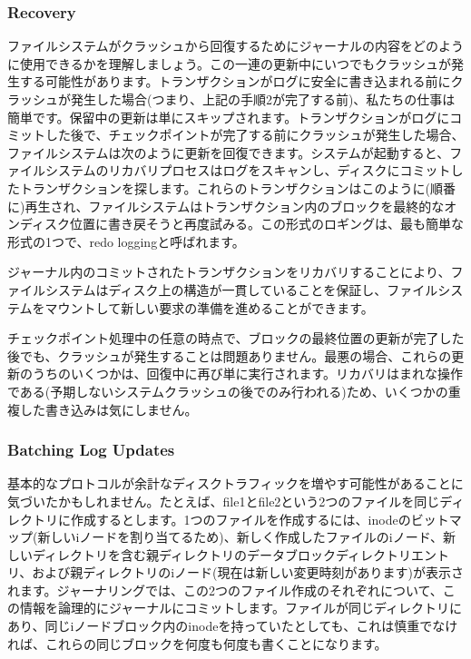 \hypertarget{recovery}{%
\subsubsection*{Recovery}\label{recovery}}

ファイルシステムがクラッシュから回復するためにジャーナルの内容をどのように使用できるかを理解しましょう。この一連の更新中にいつでもクラッシュが発生する可能性があります。トランザクションがログに安全に書き込まれる前にクラッシュが発生した場合(つまり、上記の手順2が完了する前)、私たちの仕事は簡単です。保留中の更新は単にスキップされます。トランザクションがログにコミットした後で、チェックポイントが完了する前にクラッシュが発生した場合、ファイルシステムは次のように更新を回復できます。システムが起動すると、ファイルシステムのリカバリプロセスはログをスキャンし、ディスクにコミットしたトランザクションを探します。これらのトランザクションはこのように(順番に)再生され、ファイルシステムはトランザクション内のブロックを最終的なオンディスク位置に書き戻そうと再度試みる。この形式のロギングは、最も簡単な形式の1つで、redo
loggingと呼ばれます。

ジャーナル内のコミットされたトランザクションをリカバリすることにより、ファイルシステムはディスク上の構造が一貫していることを保証し、ファイルシステムをマウントして新しい要求の準備を進めることができます。

チェックポイント処理中の任意の時点で、ブロックの最終位置の更新が完了した後でも、クラッシュが発生することは問題ありません。最悪の場合、これらの更新のうちのいくつかは、回復中に再び単に実行されます。リカバリはまれな操作である(予期しないシステムクラッシュの後でのみ行われる)ため、いくつかの重複した書き込みは気にしません。

\hypertarget{batching-log-updates}{%
\subsubsection*{Batching Log Updates}\label{batching-log-updates}}

基本的なプロトコルが余計なディスクトラフィックを増やす可能性があることに気づいたかもしれません。たとえば、file1とfile2という2つのファイルを同じディレクトリに作成するとします。1つのファイルを作成するには、inodeのビットマップ(新しいiノードを割り当てるため)、新しく作成したファイルのiノード、新しいディレクトリを含む親ディレクトリのデータブロックディレクトリエントリ、および親ディレクトリのiノード(現在は新しい変更時刻があります)が表示されます。ジャーナリングでは、この2つのファイル作成のそれぞれについて、この情報を論理的にジャーナルにコミットします。ファイルが同じディレクトリにあり、同じiノードブロック内のinodeを持っていたとしても、これは慎重でなければ、これらの同じブロックを何度も何度も書くことになります。

